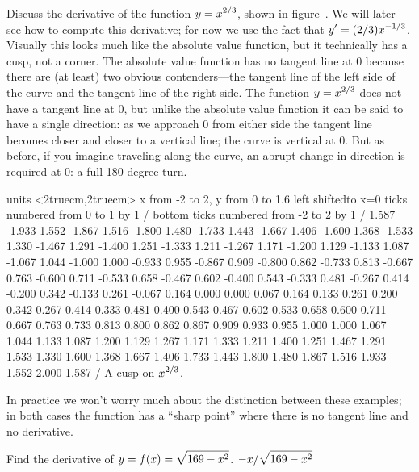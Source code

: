 \endexample

\example

Discuss the derivative of the function $\displaystyle y=x^{2/3}$, shown in
figure~. We will later see how to compute this
derivative; for now we use the fact that $\displaystyle
y'=(2/3)x^{-1/3}$. Visually this looks much like the absolute value
function, but it technically has a cusp, not a corner. The absolute
value function has no tangent line at 0 because there are (at least)
two obvious contenders---the tangent line of the left side of the
curve and the tangent line of the right side.
The function $\displaystyle y=x^{2/3}$ does not have a tangent line at 0, but
unlike the absolute value function it can be said to have a single
direction: as we approach 0 from either side the tangent line becomes
closer and closer to a vertical line; the curve is vertical at 0. But
as before, if you imagine traveling along the curve, an abrupt change
in direction is required at 0: a full 180 degree turn.  \endexample

\figure
\texonly
\vbox{\beginpicture
\normalgraphs
\ninepoint
\setcoordinatesystem units <2truecm,2truecm>
\setplotarea x from -2 to 2, y from 0 to 1.6
\axis left shiftedto x=0 ticks numbered from 0 to 1 by 1 /
\axis bottom ticks numbered from -2 to 2 by 1 /
\setquadratic
{} 1.587 -1.933 1.552 -1.867 1.516 -1.800 1.480 -1.733 1.443 
-1.667 1.406 -1.600 1.368 -1.533 1.330 -1.467 1.291 -1.400 1.251 
-1.333 1.211 -1.267 1.171 -1.200 1.129 -1.133 1.087 -1.067 1.044 
-1.000 1.000 -0.933 0.955 -0.867 0.909 -0.800 0.862 -0.733 0.813 
-0.667 0.763 -0.600 0.711 -0.533 0.658 -0.467 0.602 -0.400 0.543 
-0.333 0.481 -0.267 0.414 -0.200 0.342 -0.133 0.261 -0.067 0.164 
0.000 0.000 0.067 0.164 0.133 0.261 0.200 0.342 0.267 0.414 
0.333 0.481 0.400 0.543 0.467 0.602 0.533 0.658 0.600 0.711 
0.667 0.763 0.733 0.813 0.800 0.862 0.867 0.909 0.933 0.955 
1.000 1.000 1.067 1.044 1.133 1.087 1.200 1.129 1.267 1.171 
1.333 1.211 1.400 1.251 1.467 1.291 1.533 1.330 1.600 1.368 
1.667 1.406 1.733 1.443 1.800 1.480 1.867 1.516 1.933 1.552 
2.000 1.587   /
\endpicture}
\endtexonly
{}
\begincaption
A cusp on $\displaystyle x^{2/3}$.
\endcaption
\endfigure

In practice we won't worry much about the distinction between these
examples; in both cases the function has a ``sharp point'' where there
is no tangent line and no derivative.

\exercises

\exercise
Find the derivative of $\displaystyle y=f(x)=\sqrt{169-x^2}$.
\answer $\displaystyle -x/\sqrt{169-x^2}$
\endanswer
\endexercise

